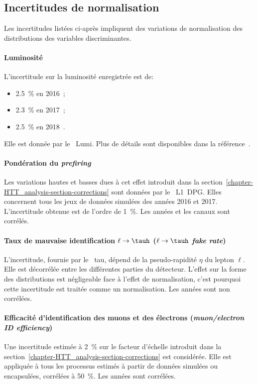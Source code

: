 \subsection{Incertitudes de normalisation}\label{chapter-HTT_analysis-section-systematics-normalization}
Les incertitudes listées ci-après impliquent des variations de normalisation des distributions des variables discriminantes.
\paragraph{Luminosité}
L'incertitude sur la luminosité enregistrée est de:
\begin{itemize}
\item \SI{2.5}{\%} en 2016~\cite{CMS-PAS-LUM-17-001};
\item \SI{2.3}{\%} en 2017~\cite{CMS-PAS-LUM-17-004};
\item \SI{2.5}{\%} en 2018~\cite{CMS-PAS-LUM-18-002}.
\end{itemize}
Elle est donnée par le \POG\ Lumi.
Plus de détails sont disponibles dans la référence~\cite{LumiTwiki}.
\paragraph{Pondération du \emph{prefiring}}
Les variations hautes et basses dues à cet effet introduit dans la section~\ref{chapter-HTT_analysis-section-corrections} sont données par le \POG\ L1~DPG.
Elles concernent tous les jeux de données simulées des années 2016 et 2017.
L'incertitude obtenue est de l'ordre de \SI{1}{\%}.
Les années et les canaux sont corrélés.
\paragraph{Taux de mauvaise identification $\ell\to\tauh$ (\emph{$\ell\to\tauh$ fake rate})}
L'incertitude, fournie par le \POG\ tau, dépend de la pseudo-rapidité $\eta$ du lepton $\ell$.
Elle est décorrélée entre les différentes parties du détecteur.
L'effet sur la forme des distributions est négligeable face à l'effet de normalisation, c'est pourquoi cette incertitude est traitée comme un normalisation.
Les années sont non corrélées.
\paragraph{Efficacité d'identification des muons et des électrons (\emph{muon/electron ID efficiency})}
Une incertitude estimée à \SI{2}{\%} sur le facteur d'échelle introduit dans la section~\ref{chapter-HTT_analysis-section-corrections} est considérée.
Elle est appliquée à tous les processus estimés à partir de données simulées ou encapsulées, corrélées à \SI{50}{\%}.
Les années sont corrélées.
